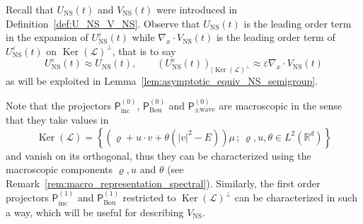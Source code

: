 \documentclass[AHL,Unicode,longabstracts,published]{cedram}
\DeclareMathOperator{\nul}{Ker}
\newcommand{\ns}{\mathrm{NS}}
\newcommand{\Wave}{\mathrm{wave}}
\newcommand{\Inc}{\mathrm{inc}}
\newcommand{\Bou}{\mathrm{Bou}}
\newcommand{\R}{\mathbb{R}}
\newcommand{\LL}{\mathcal{L}}
\newcommand{\PP}{\mathsf{P}}
\newcommand*\eps{{\varepsilon}}
\begin{document}
\begin{rema}
Recall that $U_\ns(t)$ and $V_\ns(t)$ were introduced in Definition~\ref{def:U_NS_V_NS}. Observe that $U_\ns(t)$ is the leading order term in the expansion of $U^\eps_\ns(t)$ while $\nabla_x \cdot V_{\ns}(t)$ is the leading order term of $U^\eps_\ns(t)$ on $\nul(\LL)^\perp$, that is to say
\[
U^\eps_\ns(t) \approx U_\ns(t), \qquad \left(U^\eps_\ns(t)\right)_{| \nul(\LL)^\perp } \approx \eps \nabla_{x} \cdot V_\ns(t)
\]
as will be {exploited} in Lemma~\ref{lem:asymptotic_equiv_NS_semigroup}.
\end{rema}

Note that the projectors $\PP_{\Inc}^{(0)}$, $\PP_{\Bou}^{(0)}$ and $\PP_{\pm \Wave}^{(0)}$ are macroscopic in the sense that they take values in
\[
\nul(\LL) = \left\{ \left(\varrho + u \cdot v + \theta \left(|v|^2 - E \right) \right) \mu \, ; \, \varrho, u, \theta \in L^2\left(\R^d \right) \right \}
\]
and vanish on its orthogonal, thus they can be characterized using the macroscopic components $\varrho, u$ and $\theta$ (see Remark~\ref{rem:macro_representation_spectral}). Similarly, the first order projectors $\PP^{(1)}_\Inc$ and $\PP^{(1)}_\Bou$ restricted to $\nul(\LL)^\perp$ can be characterized in such a way, which will be useful for describing $V_\ns$.
\end{document}
